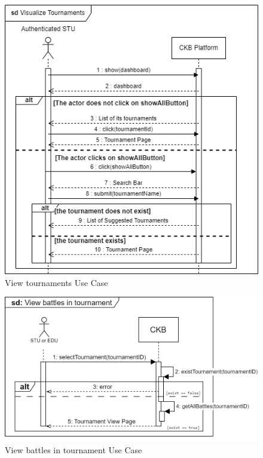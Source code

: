 \begin{figure}[H]
    \centering
    \includegraphics[width=1\textwidth]{images/sequence_diagrams/ClassDiagram-UC15.2-SequenceDiagram.png}
    \caption{View tournaments Use Case}
    \label{fig:uc15.2}
\end{figure}
\begin{figure}[H]
    \centering
    \includegraphics[width=1\textwidth]{images/sequence_diagrams/.png/View_Battles_in_Tournament - UC16.png}
    \caption{View battles in tournament Use Case}
    \label{fig:uc16}
\end{figure}
